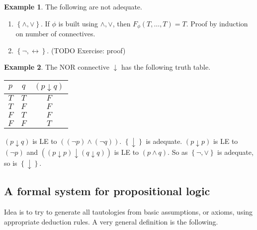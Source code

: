 \documentclass{article}
\newcommand{\rb}[1]{\left( #1 \right)}
\newcommand{\cb}[1]{\left\{ #1 \right\}}
\newcommand{\notb}[1]{\rb{\neg #1}}
\newcommand{\andb}[2]{\rb{#1 \land #2}}
\theoremstyle{definition}\newtheorem{definition}{Definition}[subsection]
\theoremstyle{definition}\newtheorem{remark}[definition]{Remark}
\theoremstyle{definition}\newtheorem*{example}{Example}
\theoremstyle{definition}\newtheorem*{note}{Note}
\begin{document}
\begin{example}
The following are not adequate.
\begin{enumerate}
\item $ \cb{\land, \lor} $. If $ \phi $ is built using $ \land, \lor $, then $ F_\phi\rb{T, \dots, T} = T $. Proof by induction on number of connectives.
\item $ \cb{\neg, \leftrightarrow} $. (TODO Exercise: proof)
\end{enumerate}
\end{example}

\begin{example}
The NOR connective $ \downarrow $ has the following truth table.
\begin{center}
\begin{tabular}{|c|c|c|}
\hline
$ p $ & $ q $ & $ \rb{p \downarrow q} $ \\
\hline
$ T $ & $ T $ & $ F $ \\
\hline
$ T $ & $ F $ & $ F $ \\
\hline
$ F $ & $ T $ & $ F $ \\
\hline
$ F $ & $ F $ & $ T $ \\
\hline
\end{tabular}
\end{center}
$ \rb{p \downarrow q} $ is LE to $ \andb{\notb{p}}{\notb{q}} $. $ \cb{\downarrow} $ is adequate. $ \rb{p \downarrow p} $ is LE to $ \notb{p} $ and $ \rb{\rb{p \downarrow p} \downarrow \rb{q \downarrow q}} $ is LE to $ \andb{p}{q} $. So as $ \cb{\neg, \lor} $ is adequate, so is $ \cb{\downarrow} $.
\end{example}

\subsection{A formal system for propositional logic}

Idea is to try to generate all tautologies from basic assumptions, or axioms, using appropriate deduction rules. A very general definition is the following.
\end{document}
